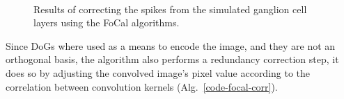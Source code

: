 \documentclass{frontiersENG} %
\begin{document}
\begin{figure}[hbt]
	\centering
	\\
	\caption{Results of correcting the spikes from the simulated ganglion cell layers using the FoCal algorithms.}
	\label{fig-convolution-results}
\end{figure}
Since DoGs where used as a means to encode the image, and they are not an orthogonal basis, the algorithm also performs a redundancy correction step, it does so by 
adjusting the convolved image's pixel value according to the correlation 
between convolution kernels (Alg.~\ref{code-focal-corr}).
\end{document}
